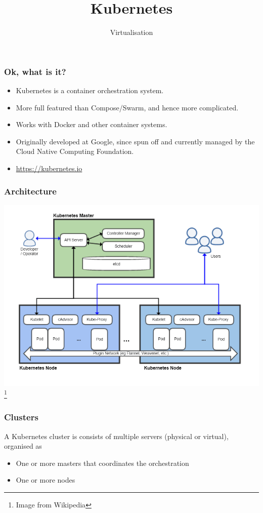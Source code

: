 \documentclass[10pt]{beamer}
\title{Kubernetes}
\author[I720]{Virtualisation}
\institute[Otago Polytechnic]{
  Otago Polytechnic \\
  Dunedin, New Zealand \\
}
\date{}
\begin{document}
\begin{frame}[plain]
  \titlepage
\end{frame}


\begin{frame}
  \frametitle{Ok, what is it?}
   
   \begin{itemize}
     \item Kubernetes is a container orchestration system.
     \item More full featured than Compose/Swarm, and hence more complicated.
     \item Works with Docker and other container systems.
     \item Originally developed at Google, since spun off and currently managed by the Cloud Native Computing Foundation.
     \item \url{https://kubernetes.io}
   \end{itemize}
\end{frame}
 
  
\begin{frame}
 \frametitle{Architecture}
  
   \begin{center}
     \includegraphics[scale=0.3]{arch}\footnote{Image from Wikipedia}
     \end{center}
\end{frame}

\begin{frame}
  \frametitle{Clusters}
   
   A Kubernetes cluster is consists of multiple servers (physical or virtual), organised as 
   \begin{itemize}
     \item One or more masters that coordinates the orchestration
     \item One or more nodes
        \end{itemize}
\end{frame}
\end{document}
